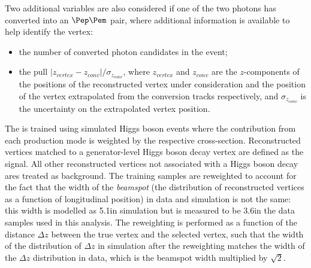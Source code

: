 Two additional variables are also considered if one of the two photons has converted into an $\Pep\Pem$ pair, where additional information is available to help identify the vertex:
\begin{itemize}
\item the number of converted photon candidates in the event;
\item the pull $|z_{vertex} - z_{conv}|/\sigma_{z_{conv}} $, where $z_{vertex}$ and $ z_{conv}$ are the $z$-components of the positions of the reconstructed vertex under consideration  and the position of the vertex extrapolated from the conversion tracks respectively, and $\sigma_{z_{conv}} $ is the uncertainty on the extrapolated vertex position.
\end{itemize}

The \VtxIdBdt is trained using simulated Higgs boson events %
where the contribution from each production mode is weighted by the respective cross-section. Reconstructed vertices matched to a generator-level Higgs boson decay vertex are defined as the signal. All other reconstructed vertices not associated with a Higgs boson decay ares treated as background. The training samples are reweighted to account for the fact that the width of the \emph{beamspot} (the distribution of reconstructed vertices as a function of longitudinal position) in data and simulation is not the same: this width is modelled as 5.1\cm in simulation but is measured to be 3.6\cm in the data samples used in this analysis. The reweighting is performed as a function of the distance $\Delta z$ between the true vertex and the selected vertex, such that the width of the distribution of $\Delta z$ in simulation after the reweighting matches the width of the $\Delta z$ distribution in data, which is the beamspot width multiplied by $\sqrt{2}$.

